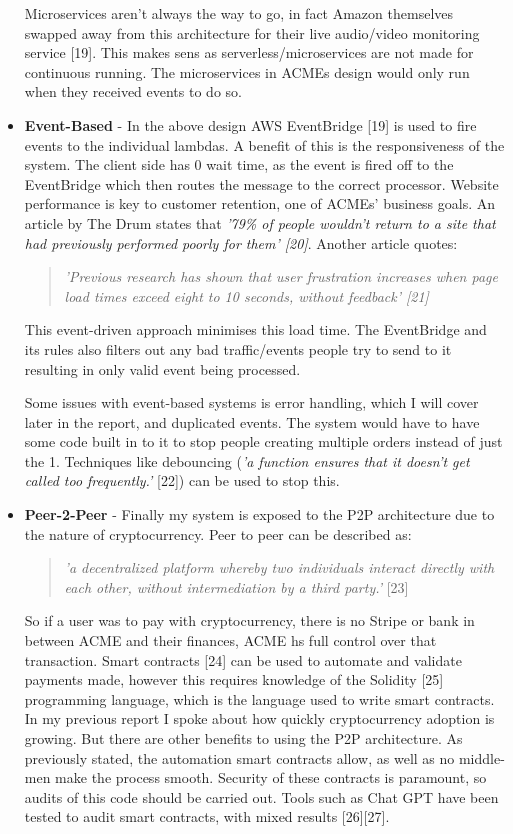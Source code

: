 \begin{itemize}
    Microservices aren't always the way to go, in fact Amazon themselves swapped away from this architecture for their live audio/video monitoring service [19].
    This makes sens as serverless/microservices are not made for continuous running. The microservices in ACMEs design would only run when they received events
    to do so.

    \item \textbf{Event-Based} - In the above design AWS EventBridge [19] is used to fire events to the individual lambdas. A benefit of this is the 
    responsiveness of the system. The client side has 0 wait time, as the event is fired off to the EventBridge which then routes the message to the correct 
    processor. Website performance is key to customer retention, one of ACMEs' business goals. An article by The Drum states that \textit{'79\% of people 
    wouldn't return to a site that had previously performed poorly for them' [20]}. Another article quotes:
    \begin{quote}
      \textit{'Previous research has shown that user frustration increases when page load times exceed eight to 10 seconds, without feedback' [21]}
    \end{quote}
    This event-driven approach minimises this load time. The EventBridge and its rules also filters out any bad traffic/events people try to send to it
    resulting in only valid event being processed.

    Some issues with event-based systems is error handling, which I will cover later in the report, and duplicated events. The system would have to have 
    some code built in to it to stop people creating multiple orders instead of just the 1. Techniques like debouncing (\textit {'a function ensures that 
    it doesn't get called too frequently.'} [22]) can be used to stop this. 

    \item \textbf{Peer-2-Peer} - Finally my system is exposed to the P2P architecture due to the nature of cryptocurrency. Peer to peer can be described as:
    \begin{quote}
      \textit{'a decentralized platform whereby two individuals interact directly with each other, without intermediation 
      by a third party.'} [23]
    \end{quote}

    So if a user was to pay with cryptocurrency, there is no Stripe or bank in between ACME and their finances, ACME hs full control over that transaction.
    Smart contracts [24] can be used to automate and validate payments made, however this requires knowledge of the Solidity [25] programming language, which 
    is the language used to write smart contracts. In my previous report I spoke about how quickly cryptocurrency adoption is growing. But there are other 
    benefits to using the P2P architecture. As previously stated, the automation smart contracts allow, as well as no middle-men make the process smooth.
    Security of these contracts is paramount, so audits of this code should be carried out. Tools such as Chat GPT have been tested to audit 
    smart contracts, with mixed results [26][27].

  \end{itemize}

\newpage